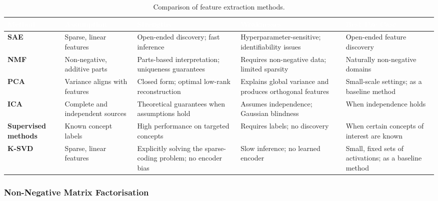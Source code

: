 \begin{table}[tb]
\centering
\caption{Comparison of feature extraction methods.}
\label{tab:decomposition-comparison}
\renewcommand{\arraystretch}{1.3}
\begin{tabular}{>{\raggedright\arraybackslash}p{2.5cm} 
                >{\raggedright\arraybackslash}p{2.8cm} 
                >{\raggedright\arraybackslash}p{2.8cm} 
                >{\raggedright\arraybackslash}p{2.8cm} 
                >{\raggedright\arraybackslash}p{2.8cm}}
\toprule
\rowcolor{tableheader!80} \textcolor{white}{\textbf{Method}} & 
\textcolor{white}{\textbf{Assumption}} & 
\textcolor{white}{\textbf{Strengths}} & 
\textcolor{white}{\textbf{Weaknesses}} & 
\textcolor{white}{\textbf{Best Use Case}} \\
\midrule
\rowcolor{tablerow1} \textbf{SAE} & Sparse, linear features & Open-ended discovery; fast inference & Hyperparameter-sensitive; identifiability issues & Open-ended feature discovery \\
\rowcolor{tablerow2} \textbf{NMF} & Non-negative, additive parts & Parts-based interpretation; uniqueness guarantees & Requires non-negative data; limited sparsity & Naturally non-negative domains \\
\rowcolor{tablerow1} \textbf{PCA} & Variance aligns with features & Closed form; optimal low-rank reconstruction & Explains global variance and produces orthogonal features & Small-scale settings; as a baseline method \\
\rowcolor{tablerow2} \textbf{ICA} & Complete and independent sources & Theoretical guarantees when assumptions hold & Assumes independence; Gaussian blindness & When independence holds \\
\rowcolor{tablerow1} \textbf{Supervised methods} & Known concept labels & High performance on targeted concepts & Requires labels; no discovery & When certain concepts of interest are known \\
\rowcolor{tablerow2} \textbf{K-SVD} & Sparse, linear features & Explicitly solving the sparse-coding problem; no encoder bias & Slow inference; no learned encoder & Small, fixed sets of activations; as a baseline method \\
\bottomrule
\end{tabular}
\end{table}

\subsubsection{Non-Negative Matrix Factorisation}

